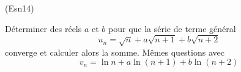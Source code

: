 \begin{tiny}(Esn14)\end{tiny} Déterminer des réels $a$ et $b$ pour que la série de terme général
\begin{displaymath}
  u_n = \sqrt{n} + a\sqrt{n+1} + b\sqrt{n+2}
\end{displaymath}
converge et calculer alors la somme. Mêmes questions avec
\begin{displaymath}
  v_n = \ln{n} + a\ln(n+1) + b\ln(n+2)
\end{displaymath}
